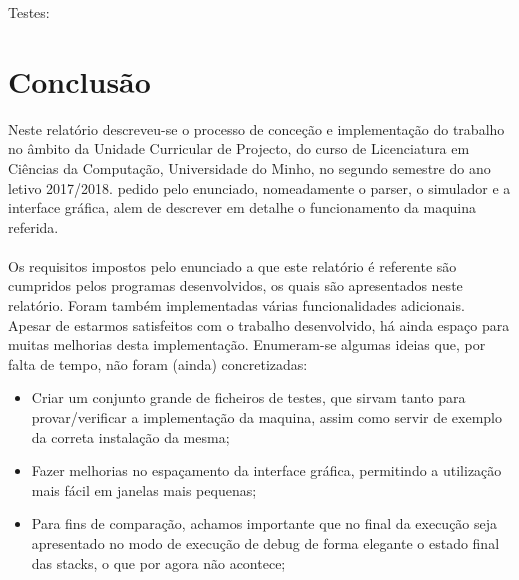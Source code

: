 \documentclass{report}
\begin{document}
Testes:

\noindent
\par
\begin{Parallel}[v]{0.48\textwidth}{0.48\textwidth}

\ParallelPar
\end{Parallel}

















\chapter{Conclusão} \label{concl}
\quad Neste relatório descreveu-se o processo de conceção e implementação do trabalho no
âmbito da Unidade Curricular de Projecto, do curso de Licenciatura em Ciências da Computação, Universidade do Minho, no
segundo semestre do ano letivo 2017/2018. pedido pelo
enunciado, nomeadamente o parser, o simulador e a interface gráfica, alem de descrever em detalhe
o funcionamento da maquina referida.\\\\
\null\quad Os requisitos impostos pelo enunciado a que este relatório é referente são cumpridos pelos programas desenvolvidos,
os quais são apresentados neste relatório. Foram também implementadas várias funcionalidades adicionais.\\
\null\quad Apesar de estarmos satisfeitos com o trabalho desenvolvido, há ainda espaço para muitas
melhorias desta implementação. Enumeram-se algumas ideias que, por falta de tempo, não foram
(ainda) concretizadas:

\begin{itemize}
\item Criar um conjunto grande de ficheiros de testes, que sirvam tanto para provar/verificar a
implementação da maquina, assim como servir de exemplo da correta instalação da mesma;
\item Fazer melhorias no espaçamento da interface gráfica, permitindo a utilização mais fácil em janelas mais pequenas;
\item Para fins de comparação, achamos importante que no final da execução seja apresentado no modo de execução de debug
 de forma elegante o estado final das stacks, o que por agora não acontece;
\end{itemize}

%
%
\end{document}
